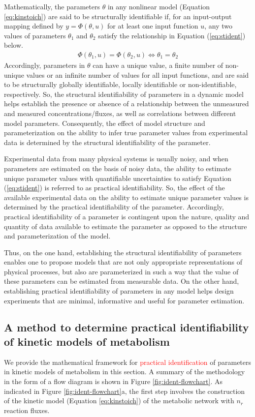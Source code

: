 \documentclass[10pt]{article}
\begin{document}
	Mathematically, the parameters $\theta$ in any nonlinear model (Equation \ref{eq:kinstoich}) are said to be structurally identifiable if, for an input-output mapping defined by $y = \Phi(\theta,u)$ for at least one input function $u$, any two values of parameters $\theta_1$ and $\theta_2$ satisfy the relationship in Equation (\ref{eq:stident}) below.
	\begin{align}\label{eq:stident}
	\Phi(\theta_1,u) = \Phi(\theta_2,u) \iff \theta_1 = \theta_2
	\end{align}
	Accordingly, parameters in $\theta$ can have a unique value, a finite number of non-unique values or an infinite number of values for all input functions, and are said to be structurally globally identifiable, locally identifiable or non-identifiable, respectively. So, the structural identifiability of parameters in a dynamic model helps establish the presence or absence of a relationship between the unmeasured and measured concentrations/fluxes, as well as correlations between different model parameters. Consequently, the effect of model structure and parameterization on the ability to infer true parameter values from experimental data is determined by the structural identifiability of the parameter. 
	
	Experimental data from many physical systems is usually noisy, and when parameters are estimated on the basis of noisy data, the ability to estimate unique parameter values with quantifiable uncertainties to satisfy Equation (\ref{eq:stident}) is referred to as practical identifiability. So, the effect of the available experimental data on the ability to estimate unique parameter values is determined by the practical identifiability of the parameter. Accordingly, practical identifiability of a parameter is contingent upon the nature, quality and quantity of data available to estimate the parameter as opposed to the structure and parameterization of the model. 
	
	Thus, on the one hand, establishing the structural identifiability of parameters enables one to propose models that are not only appropriate representations of physical processes, but also are parameterized in such a way that the value of these parameters can be estimated from measurable data. On the other hand, establishing practical identifiability of parameters in any model helps design experiments that are minimal, informative and useful for parameter estimation.	

	\subsection{A method to determine practical identifiability of kinetic models of metabolism}\label{sec:ident}
	We provide the mathematical framework for \textcolor{red}{practical identification} of parameters in kinetic models of metabolism in this section. A summary of the methodology in the form of a flow diagram is shown in Figure \ref{fig:ident-flowchart}. As indicated in Figure \ref{fig:ident-flowchart}a, the first step involves the construction of the kinetic model (Equation \ref{eq:kinstoich}) of the metabolic network with $n_r$ reaction fluxes.
	
\end{document}
